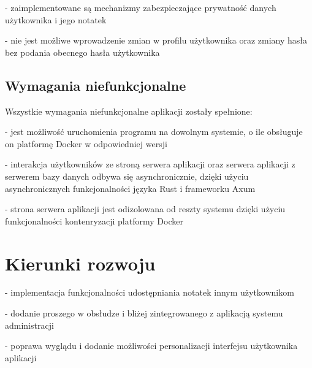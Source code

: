 \documentclass[a4paper,twoside,12pt]{book}
\begin{document}
- zaimplementowane są mechanizmy zabezpieczające prywatność danych użytkownika i jego notatek

- nie jest możliwe wprowadzenie zmian w profilu użytkownika oraz zmiany hasła bez podania
obecnego hasła użytkownika

\subsection{Wymagania niefunkcjonalne}

Wszystkie wymagania niefunkcjonalne aplikacji zostały spełnione:

- jest możliwość uruchomienia programu na dowolnym systemie, o ile obsługuje on platformę Docker w odpowiedniej wersji

- interakcja użytkowników ze stroną serwera aplikacji oraz serwera aplikacji z serwerem bazy 
danych odbywa się asynchronicznie, dzięki użyciu asynchronicznych funkcjonalności języka Rust i frameworku Axum

- strona serwera aplikacji jest odizolowana od reszty systemu dzięki użyciu funkcjonalności
kontenryzacji platformy Docker


\section{Kierunki rozwoju}

- implementacja funkcjonalności udostępniania notatek innym użytkownikom

- dodanie proszego w obsłudze i bliżej zintegrowanego z aplikacją systemu administracji

- poprawa wyglądu i dodanie możliwości personalizacji interfejsu użytkownika aplikacji


\backmatter

\end{document}
